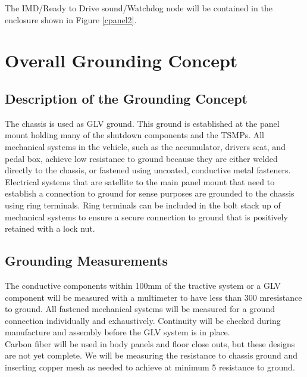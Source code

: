 \documentclass{article}
\begin{document}
            The IMD/Ready to Drive sound/Watchdog node will be contained in the enclosure shown in Figure \ref{cpanel2}.

\newpage

\section{Overall Grounding Concept}

    \subsection{Description of the Grounding Concept}


        The chassis is used as GLV ground. This ground is established at the panel mount holding many of the shutdown components and the TSMPs. All mechanical systems in the vehicle, such as the accumulator, drivers seat, and pedal box, achieve low resistance to ground because they are either welded directly to the chassis, or fastened using uncoated, conductive metal fasteners. Electrical systems that are satellite to the main panel mount that need to establish a connection to ground for sense purposes are grounded to the chassis using ring terminals. Ring terminals can be included in the bolt stack up of mechanical systems to ensure a secure connection to ground that is positively retained with a lock nut.


    \subsection{Grounding Measurements}

        The conductive components within 100mm of the tractive system or a GLV component will be measured with a multimeter to have less than 300 m\ohm resistance to ground. All fastened mechanical systems will be measured for a ground connection individually and exhaustively. Continuity will be checked during manufacture and assembly before the GLV system is in place.\\

        Carbon fiber will be used in body panels and floor close outs, but these designs are not yet complete. We will be measuring the resistance to chassis ground and inserting copper mesh as needed to achieve at minimum 5 \ohm resistance to ground.
\end{document}
